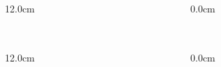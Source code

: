\begin{frame}
\begin{columns}
\begin{column}{12.0cm}
\vspace{8.2cm}

\end{column}\begin{column}{0.0cm}\end{column}\end{columns}
\end{frame}

\begin{frame}
\frametitle{}
\scriptsize
\begin{columns}\begin{column}{12.0cm}

%
%
%
%

\end{column}\begin{column}{0.0cm}\end{column}\end{columns}
\end{frame}
